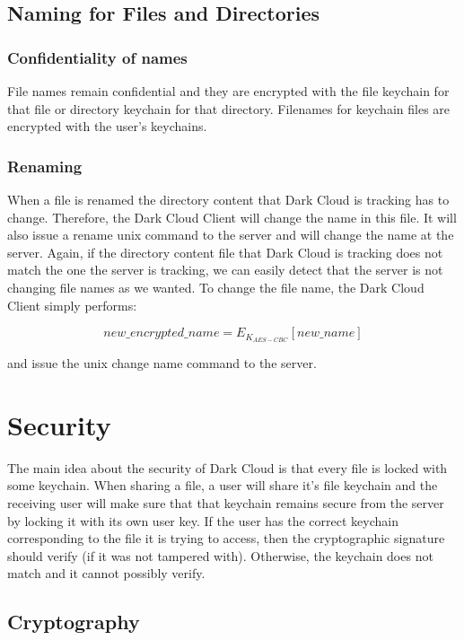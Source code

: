 \documentclass[a4paper]{article}
\begin{document}
\subsection{Naming for Files and Directories}

\subsubsection{Confidentiality of names}
File names remain confidential and they are encrypted with the file keychain for that file or directory keychain for that directory.
Filenames for keychain files are encrypted with the user's keychains.\\

\subsubsection{Renaming}
When a file is renamed the directory content that Dark Cloud is tracking has to change. Therefore, the Dark Cloud Client will change the name in this file. It will also issue a rename unix command to the server and will change the name at the server. Again, if the directory content file that Dark Cloud is tracking does not match the one the server is tracking, we can easily detect that the server is not changing file names as we wanted. To change the file name, the Dark Cloud Client simply performs:

$$new\_encrypted\_name = E_{K_{AES-CBC}}[new\_name]$$

and issue the unix change name command to the server.

\section{Security}

The main idea about the security of Dark Cloud is that every file is locked with some keychain. When sharing a file, a user will share it's file keychain and the receiving user will make sure that that keychain remains secure from the server by locking it with its own user key. If the user has the correct keychain corresponding to the file it is trying to access, then the cryptographic signature should verify (if it was not tampered with). Otherwise, the keychain does not match and it cannot possibly verify.

\subsection{Cryptography}
\end{document}
